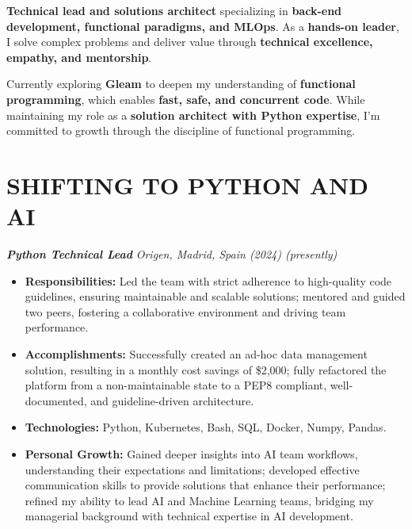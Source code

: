 \documentclass[a4paper,10pt]{article}
\begin{document}
\noindent
\begin{minipage}[t]{0.65\textwidth}
\begin{minipage}[t]{\dimexpr\linewidth-25px}
\justifying

\textbf{Technical lead and solutions architect} specializing in \textbf{back-end development, functional paradigms, and MLOps}. As a \textbf{hands-on leader}, I solve complex problems and deliver value through \textbf{technical excellence, empathy, and mentorship}.

\vspace{0.2cm}

Currently exploring \textbf{Gleam} to deepen my understanding of \textbf{functional programming}, which enables \textbf{fast, safe, and concurrent code}. While maintaining my role as a \textbf{solution architect with Python expertise}, I'm committed to growth through the discipline of functional programming.

    \section*{\large SHIFTING TO PYTHON AND AI}
    \textbf{\textit{Python Technical Lead}}
    \textit{\small Origen, Madrid, Spain (2024) (presently)}
    \vspace{0.3cm}
    \begin{itemize}[leftmargin=*]
        \item \textbf{Responsibilities:} Led the team with strict adherence to high-quality code guidelines, ensuring maintainable and scalable solutions; mentored and guided two peers, fostering a collaborative environment and driving team performance.
        \item \textbf{Accomplishments:} Successfully created an ad-hoc data management solution, resulting in a monthly cost savings of \$2,000; fully refactored the platform from a non-maintainable state to a PEP8 compliant, well-documented, and guideline-driven architecture.
        \item \textbf{Technologies:} Python, Kubernetes, Bash, SQL, Docker, Numpy, Pandas.
        \item \textbf{Personal Growth:} Gained deeper insights into AI team workflows, understanding their expectations and limitations; developed effective communication skills to provide solutions that enhance their performance; refined my ability to lead AI and Machine Learning teams, bridging my managerial background with technical expertise in AI development.
    \end{itemize}


\end{minipage}
\end{minipage}
\end{document}
